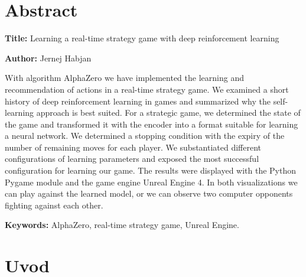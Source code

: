 \documentclass[a4paper, 12pt]{book}
\newcommand{\ttitleEn}{Learning a real-time strategy game with deep reinforcement learning}
\newcommand{\tauthor}{Jernej Habjan}
\newcommand{\tkeywordsEn}{AlphaZero, real-time strategy game, Unreal Engine}
\newcommand{\clearemptydoublepage}{\newpage{\pagestyle{empty}\cleardoublepage}}
\begin{document}
\chapter*{Abstract}

\noindent\textbf{Title:} \ttitleEn
\bigskip

\noindent\textbf{Author:} \tauthor
\bigskip

\noindent With algorithm AlphaZero we have implemented the learning and recommendation of actions in a real-time strategy game.
We examined a short history of deep reinforcement learning in games and summarized why the self-learning approach is best suited.
For a strategic game, we determined the state of the game and transformed it with the encoder into a format suitable for learning a neural network.
We determined a stopping condition with the expiry of the number of remaining moves for each player.
We substantiated different configurations of learning parameters and exposed the most successful configuration for learning our game.
The results were displayed with the Python Pygame module and the game engine Unreal Engine 4.
In both visualizations we can play against the learned model, or we can observe two computer opponents fighting against each other.
\bigskip

\noindent\textbf{Keywords:} \tkeywordsEn.
\clearemptydoublepage

\mainmatter
\setcounter{page}{1}
\pagestyle{fancy}



\chapter{Uvod}
\end{document}
